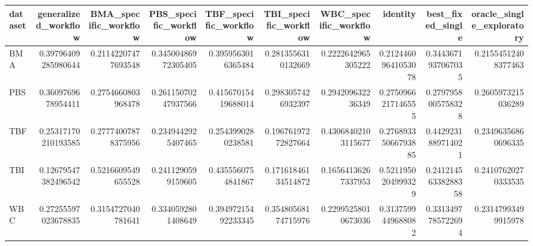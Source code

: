 \begin{tabular}{lrrrrrrrrr}
\hline
dataset & generalized\_workflow & BMA\_specific\_workflow & PBS\_specific\_workflow & TBF\_specific\_workflow & TBI\_specific\_workflow & WBC\_specific\_workflow & identity & best\_fixed\_single & oracle\_single\_exploratory \\
\hline
BMA & 0.39796409285980644 & 0.21142207477693548 & 0.34500486972305405 & 0.3959563016365484 & 0.2813556310132669 & 0.2222642965305222 & 0.21244609641053078 & 0.3443671937067035 & 0.21554512408377463 \\
PBS & 0.3609769678954411 & 0.2754660803968478 & 0.26115070247937566 & 0.41567015419688014 & 0.2983057426932397 & 0.294209632236349 & 0.2750966217146555 & 0.2797958005758328 & 0.2605973215036289 \\
TBF & 0.25317170210193585 & 0.27774007878375956 & 0.2349442925407465 & 0.2543990280238581 & 0.19676197272827664 & 0.43068402103115677 & 0.27689335066793885 & 0.4429231889714021 & 0.23496356860696335 \\
TBI & 0.12679547382496542 & 0.5216609549655528 & 0.2411290599159605 & 0.4355560754841867 & 0.17161846134514872 & 0.16564136267337953 & 0.5211950204999329 & 0.24121456338288358 & 0.24107620270333535 \\
WBC & 0.27255597023678835 & 0.3154727040781641 & 0.3340592801408649 & 0.39497215492233345 & 0.35480568174715976 & 0.22995258010673036 & 0.3137599449688082 & 0.3313497785722694 & 0.23147993499915978 \\
\hline
\end{tabular}
